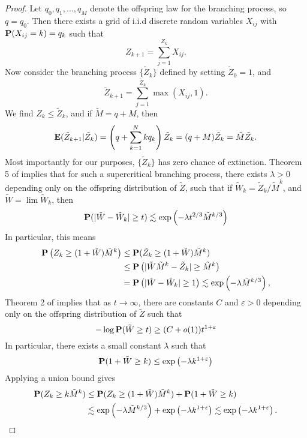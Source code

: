 \begin{proof}
	Let $q_0, q_1, \dots, q_M$ denote the offspring law for the branching process, so $q = q_0$. Then there exists a grid of i.i.d discrete random variables $X_{ij}$ with $\operatorname{\mathbf{P}}(X_{ij} = k) = q_k$ such that
	\[ Z_{k+1} = \sum_{j = 1}^{Z_k} X_{ij}. \]
	Now consider the branching process $\{ \tilde{Z}_k \}$ defined by setting $\tilde{Z}_0 = 1$, and
	\[ \tilde{Z}_{k+1} = \sum_{j = 1}^{\tilde{Z}_k} \max(X_{ij}, 1). \]
	We find $Z_k \leq \tilde{Z}_k$, and if $\tilde{M} = q + M$, then
	\[ \operatorname{\mathbf{E}}(\tilde{Z}_{k+1}|\tilde{Z}_k) = \left( q + \sum_{k = 1}^N k q_k \right) \tilde{Z}_k = (q + M) \tilde{Z}_k = \tilde{M} \tilde{Z}_k. \]
	Most importantly for our purposes, $\{ \tilde{Z}_k \}$ has zero chance of extinction. Theorem 5 of \cite{Athreya} implies that for such a supercritical branching process, there exists $\lambda > 0$ depending only on the offspring distribution of $\tilde{Z}$, such that if $\tilde{W}_k = \tilde{Z}_k / \tilde{M}^k$, and $\tilde{W} = \lim \tilde{W}_k$, then
	\[ \operatorname{\mathbf{P}}(| \tilde{W} - \tilde{W}_k | \geq t) \lesssim \exp \left( - \lambda t^{2/3} \tilde{M}^{k/3} \right) \]
	In particular, this means
	\begin{align*}
		\operatorname{\mathbf{P}} \left( Z_k \geq (1 + \tilde{W}) \tilde{M}^k \right) &\leq \operatorname{\mathbf{P}}( \tilde{Z}_k \geq (1 + \tilde{W}) \tilde{M}^k )\\
		&\leq \operatorname{\mathbf{P}} \left( | \tilde{W} \tilde{M}^k - \tilde{Z}_k | \geq \tilde{M}^k \right)\\
		&= \operatorname{\mathbf{P}} \left( | \tilde{W} - \tilde{W}_k| \geq 1 \right) \lesssim \exp \left( - \lambda \tilde{M}^{k/3} \right),
	\end{align*}
	Theorem 2 of \cite{Biggins} implies that as $t \to \infty$, there are constants $C$ and $\varepsilon > 0$ depending only on the offspring distribution of $\tilde{Z}$ such that
	\[ - \log \operatorname{\mathbf{P}}(\tilde{W} \geq t) \geq (C + o(1)) t^{1 + \varepsilon} \]
	In particular, there exists a small constant $\lambda$ such that
	\[ \operatorname{\mathbf{P}}(1 + \tilde{W} \geq k) \leq \exp \left( - \lambda k^{1 + \varepsilon} \right) \]
	Applying a union bound gives
	\begin{align*}
		\operatorname{\mathbf{P}}(Z_k \geq k \tilde{M}^k ) &\leq \operatorname{\mathbf{P}}( Z_k \geq (1 + \tilde{W}) \tilde{M}^k ) + \operatorname{\mathbf{P}}(1 + \tilde{W} \geq k)\\
		&\lesssim \exp \left( - \lambda \tilde{M}^{k/3} \right) + \exp \left( - \lambda k^{1 + \varepsilon} \right) \lesssim \exp \left( - \lambda k^{1 + \varepsilon} \right). \qedhere
	\end{align*}
\end{proof}

